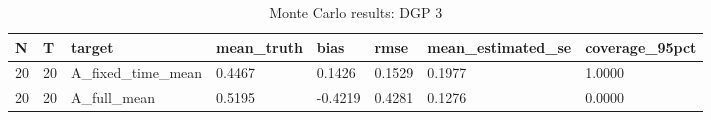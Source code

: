 \begin{table}[!htbp]
\centering
\caption{Monte Carlo results: DGP 3}
\label{tab:mc-dgp3}
\begin{tabular}{llllllll}
\toprule
N & T & target & mean\_truth & bias & rmse & mean\_estimated\_se & coverage\_95pct \\
\midrule
20 & 20 & A\_fixed\_time\_mean & 0.4467 & 0.1426 & 0.1529 & 0.1977 & 1.0000 \\
20 & 20 & A\_full\_mean & 0.5195 & -0.4219 & 0.4281 & 0.1276 & 0.0000 \\
\bottomrule
\end{tabular}
\end{table}
